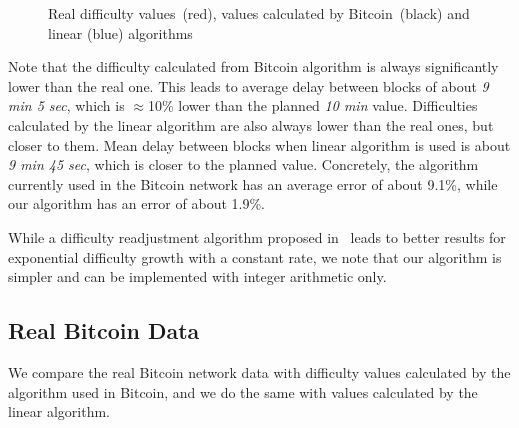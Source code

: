 \documentclass[]{llncs}
\begin{document}
\begin{figure}[h]
\caption{Real difficulty values~(red), values calculated by Bitcoin~(black) and linear (blue) algorithms}
\label{fig:exp}
\end{figure}

Note that the difficulty calculated from Bitcoin algorithm is always significantly lower than the real one.
This leads to average delay between blocks of about {\em 9 min 5 sec}, which is $\approx$10\% lower than the planned {\em 10 min} value.
Difficulties calculated by the linear algorithm are also always lower than the real ones, but closer to them.
Mean delay between blocks when linear algorithm is used is about {\em 9 min 45 sec}, which is closer to the planned value. Concretely, the algorithm currently used in the Bitcoin network has an average error of about 9.1\%, while our algorithm has an error of about 1.9\%.

While a difficulty readjustment algorithm proposed in~\cite{kraft2015difficulty} leads to better results for exponential difficulty growth with a constant rate, we note that our algorithm is simpler and can be implemented with integer arithmetic only.

\subsection{Real Bitcoin Data}

We compare the real Bitcoin network data with difficulty values calculated by the algorithm used in Bitcoin, and we do the same with values calculated by the linear algorithm. 
\end{document}
